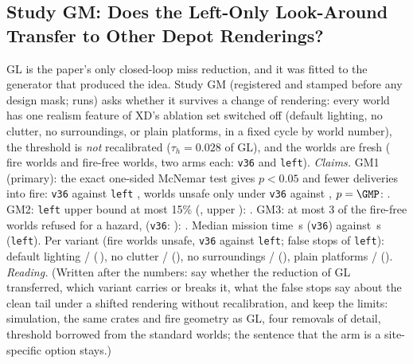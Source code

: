 \subsection{Study GM: Does the Left-Only Look-Around Transfer to Other Depot Renderings?}\label{sec:moved-gm}
GL is the paper's only closed-loop miss reduction, and it was fitted to the generator that produced the idea. Study GM (registered and stamped before any design mask; \GMTrials{} runs) asks whether it survives a change of rendering: every world has one realism feature of XD's ablation set switched off (default lighting, no clutter, no surroundings, or plain platforms, in a fixed cycle by world number), the threshold is \emph{not} recalibrated ($\tau_h=0.028$ of GL), and the worlds are fresh (\GMWorlds{} fire worlds and \GMPlain{} fire-free worlds, two arms each: \texttt{v36} and \texttt{left}).
\emph{Claims.} GM1 (primary): the exact one-sided McNemar test gives $p<0.05$ and fewer deliveries into fire: \texttt{v36} \GMV{} against \texttt{left} \GMLeft{}, \GMOnlyV{} worlds unsafe only under \texttt{v36} against \GMOnlyLeft{}, $p=\GMP$: \GMOneHolds. GM2: \texttt{left} upper bound at most 15\% (\GMLeftRate, upper \GMLeftUpper): \GMTwoHolds. GM3: at most 3 of the fire-free worlds refused for a hazard, \GMFalseStops{} (\texttt{v36}: \GMFalseStopsV): \GMThreeHolds. Median mission time \GMTimeV\,s (\texttt{v36}) against \GMTimeLeft\,s (\texttt{left}). Per variant (fire worlds unsafe, \texttt{v36} against \texttt{left}; false stops of \texttt{left}): default lighting \GMLightV{} / \GMLightLeft{} ($\,$\GMLightFS), no clutter \GMClutterV{} / \GMClutterLeft{} (\GMClutterFS), no surroundings \GMSurrV{} / \GMSurrLeft{} (\GMSurrFS), plain platforms \GMPlatV{} / \GMPlatLeft{} (\GMPlatFS).
\emph{Reading.} (Written after the numbers: say whether the reduction of GL transferred, which variant carries or breaks it, what the false stops say about the clean tail under a shifted rendering without recalibration, and keep the limits: simulation, the same crates and fire geometry as GL, four removals of detail, threshold borrowed from the standard worlds; the sentence that the arm is a site-specific option stays.)
